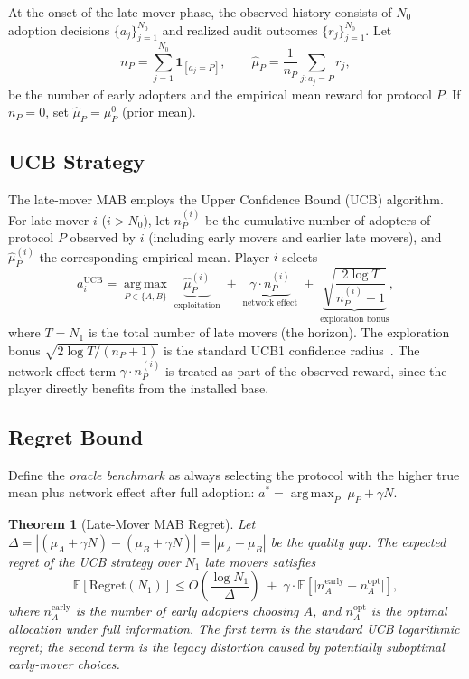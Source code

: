 \documentclass[12pt,a4paper]{article}
\newtheorem{theorem}{Theorem}[section]
\newcommand{\E}{\mathbb{E}}
\newcommand{\ind}[1]{\mathbf{1}_{[#1]}}
\newcommand{\argmax}{\operatorname*{arg\,max}}
\newcommand{\Regret}{\mathrm{Regret}}
\begin{document}
At the onset of the late-mover phase, the observed history consists of
$N_0$ adoption decisions $\{a_j\}_{j=1}^{N_0}$ and realized audit
outcomes $\{r_j\}_{j=1}^{N_0}$.  Let
\begin{equation}\label{eq:mab-suff}
    n_P = \sum_{j=1}^{N_0} \ind{a_j=P},\qquad
    \hat{\mu}_P = \frac{1}{n_P}\sum_{j:a_j=P} r_j,
\end{equation}
be the number of early adopters and the empirical mean reward for protocol
$P$.  If $n_P=0$, set $\hat{\mu}_P=\mu_P^0$ (prior mean).

\subsection{UCB Strategy}

The late-mover MAB employs the Upper Confidence Bound (UCB) algorithm.
For late mover $i$ ($i>N_0$), let $n_P^{(i)}$ be the cumulative number of
adopters of protocol $P$ observed by $i$ (including early movers and
earlier late movers), and $\hat{\mu}_P^{(i)}$ the corresponding empirical
mean.  Player $i$ selects
\begin{equation}\label{eq:ucb}
    a_i^{\text{UCB}} = \argmax_{P\in\{A,B\}}\;
    \underbrace{\hat{\mu}_P^{(i)}}_{\text{exploitation}}
    \;+\;
    \underbrace{\gamma\cdot n_P^{(i)}}_{\text{network effect}}
    \;+\;
    \underbrace{\sqrt{\frac{2\log T}{n_P^{(i)}+1}}}_{\text{exploration bonus}},
\end{equation}
where $T=N_1$ is the total number of late movers (the horizon).  The
exploration bonus $\sqrt{2\log T/(n_P+1)}$ is the standard UCB1
confidence radius~\citep{auer2002finite}.  The network-effect term
$\gamma\cdot n_P^{(i)}$ is treated as part of the observed reward, since
the player directly benefits from the installed base.

\subsection{Regret Bound}

Define the \emph{oracle benchmark} as always selecting the protocol with
the higher true mean plus network effect after full adoption:
$a^* = \argmax_P\; \mu_P + \gamma N$.

\begin{theorem}[Late-Mover MAB Regret]
\label{thm:regret}
Let $\Delta = |(\mu_A+\gamma N) - (\mu_B+\gamma N)| = |\mu_A-\mu_B|$ be the quality gap.
The expected regret of the UCB strategy over $N_1$ late movers satisfies
\begin{equation}\label{eq:regret-bound}
    \E[\Regret(N_1)] \leq
    O\!\left(\frac{\log N_1}{\Delta}\right)
    \;+\;
    \gamma\cdot\E\!\left[\big|n_A^{\text{early}} - n_A^{\text{opt}}\big|\right],
\end{equation}
where $n_A^{\text{early}}$ is the number of early adopters choosing $A$, and
$n_A^{\text{opt}}$ is the optimal allocation under full information.
The first term is the standard UCB logarithmic regret; the second term is the
\emph{legacy distortion} caused by potentially suboptimal early-mover choices.
\end{theorem}
\end{document}

